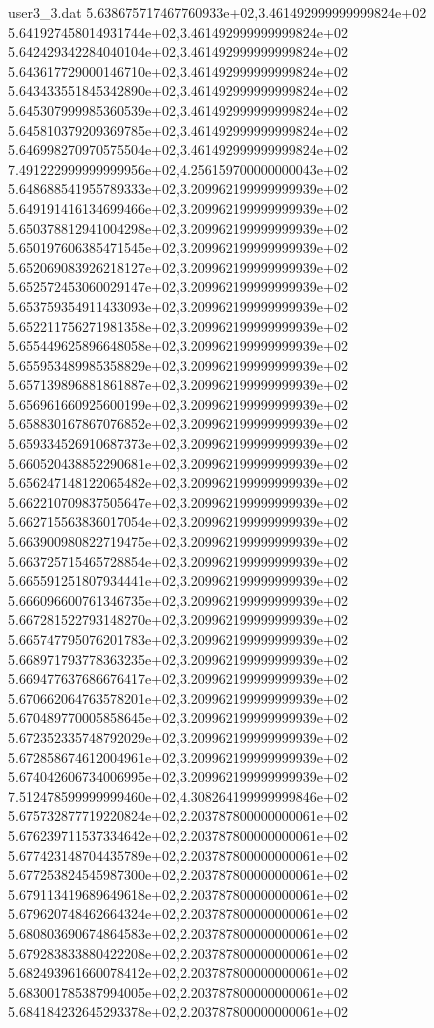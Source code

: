 \begin{filecontents}{user3_3.dat}
5.638675717467760933e+02,3.461492999999999824e+02
5.641927458014931744e+02,3.461492999999999824e+02
5.642429342284040104e+02,3.461492999999999824e+02
5.643617729000146710e+02,3.461492999999999824e+02
5.643433551845342890e+02,3.461492999999999824e+02
5.645307999985360539e+02,3.461492999999999824e+02
5.645810379209369785e+02,3.461492999999999824e+02
5.646998270970575504e+02,3.461492999999999824e+02
7.491222999999999956e+02,4.256159700000000043e+02
5.648688541955789333e+02,3.209962199999999939e+02
5.649191416134699466e+02,3.209962199999999939e+02
5.650378812941004298e+02,3.209962199999999939e+02
5.650197606385471545e+02,3.209962199999999939e+02
5.652069083926218127e+02,3.209962199999999939e+02
5.652572453060029147e+02,3.209962199999999939e+02
5.653759354911433093e+02,3.209962199999999939e+02
5.652211756271981358e+02,3.209962199999999939e+02
5.655449625896648058e+02,3.209962199999999939e+02
5.655953489985358829e+02,3.209962199999999939e+02
5.657139896881861887e+02,3.209962199999999939e+02
5.656961660925600199e+02,3.209962199999999939e+02
5.658830167867076852e+02,3.209962199999999939e+02
5.659334526910687373e+02,3.209962199999999939e+02
5.660520438852290681e+02,3.209962199999999939e+02
5.656247148122065482e+02,3.209962199999999939e+02
5.662210709837505647e+02,3.209962199999999939e+02
5.662715563836017054e+02,3.209962199999999939e+02
5.663900980822719475e+02,3.209962199999999939e+02
5.663725715465728854e+02,3.209962199999999939e+02
5.665591251807934441e+02,3.209962199999999939e+02
5.666096600761346735e+02,3.209962199999999939e+02
5.667281522793148270e+02,3.209962199999999939e+02
5.665747795076201783e+02,3.209962199999999939e+02
5.668971793778363235e+02,3.209962199999999939e+02
5.669477637686676417e+02,3.209962199999999939e+02
5.670662064763578201e+02,3.209962199999999939e+02
5.670489770005858645e+02,3.209962199999999939e+02
5.672352335748792029e+02,3.209962199999999939e+02
5.672858674612004961e+02,3.209962199999999939e+02
5.674042606734006995e+02,3.209962199999999939e+02
7.512478599999999460e+02,4.308264199999999846e+02
5.675732877719220824e+02,2.203787800000000061e+02
5.676239711537334642e+02,2.203787800000000061e+02
5.677423148704435789e+02,2.203787800000000061e+02
5.677253824545987300e+02,2.203787800000000061e+02
5.679113419689649618e+02,2.203787800000000061e+02
5.679620748462664324e+02,2.203787800000000061e+02
5.680803690674864583e+02,2.203787800000000061e+02
5.679283833880422208e+02,2.203787800000000061e+02
5.682493961660078412e+02,2.203787800000000061e+02
5.683001785387994005e+02,2.203787800000000061e+02
5.684184232645293378e+02,2.203787800000000061e+02

\end{filecontents}
